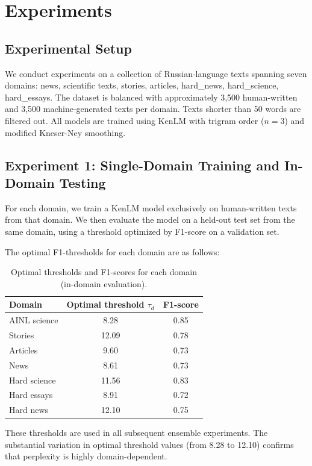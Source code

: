 \documentclass{article}
\begin{document}
\section{Experiments}\label{sec:exp}

\subsection{Experimental Setup}

We conduct experiments on a collection of Russian-language texts spanning seven domains: news, scientific texts, stories, articles, hard\_news, hard\_science, hard\_essays. The dataset is balanced with approximately 3,500 human-written and 3,500 machine-generated texts per domain. Texts shorter than 50 words are filtered out. All models are trained using KenLM with trigram order ($n=3$) and modified Kneser-Ney smoothing. 

\subsection{Experiment 1: Single-Domain Training and In-Domain Testing}

For each domain, we train a KenLM model exclusively on human-written texts from that domain. We then evaluate the model on a held-out test set from the same domain, using a threshold optimized by F1-score on a validation set.

The optimal F1-thresholds for each domain are as follows:

\begin{table}[H]
\centering
\caption{Optimal thresholds and F1-scores for each domain (in-domain evaluation).}
\begin{tabular}{|l|c|c|}
\hline
\textbf{Domain} & \textbf{Optimal threshold} $\tau_d$ & \textbf{F1-score} \\
\hline
AINL science & 8.28 & 0.85 \\
Stories & 12.09 & 0.78 \\
Articles & 9.60 & 0.73 \\
News & 8.61 & 0.73 \\
Hard science & 11.56 & 0.83 \\
Hard essays & 8.91 & 0.72 \\
Hard news & 12.10 & 0.75 \\
\hline
\end{tabular}
\end{table}

These thresholds are used in all subsequent ensemble experiments. The substantial variation in optimal threshold values (from 8.28 to 12.10) confirms that perplexity is highly domain-dependent.
\end{document}
